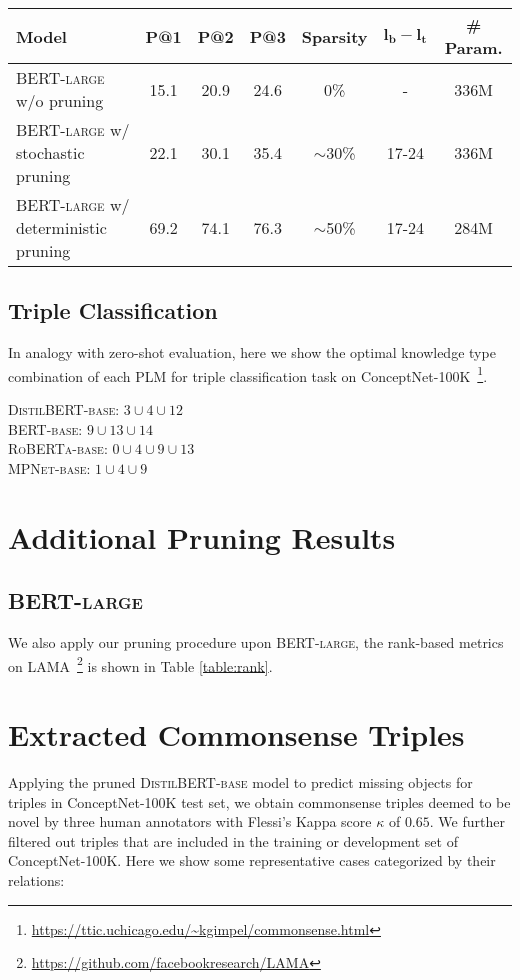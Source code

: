 \documentclass[11pt]{article}
\begin{document}
\begin{table*}[tb!]
	\centering
	\footnotesize
	\begin{tabular}{l|ccc|c|c|c}
		\toprule
		\textbf{Model} & \textbf{P@1} & \textbf{P@2} & \textbf{P@3} & \textbf{Sparsity}  & $\bm{l_b-l_t}$ & \textbf{\# Param.}\\
		\midrule
		\textsc{BERT-large} w/o pruning &15.1  &20.9   &24.6  & 0\% & - &336M  \\
		\textsc{BERT-large} w/ stochastic pruning &22.1  &30.1   &35.4   & $\sim$30\% & 17-24 &336M \\
		\textsc{BERT-large} w/ deterministic pruning &69.2  &74.1   &76.3   & $\sim$50\% & 17-24 & 284M\\
		\bottomrule
	\end{tabular}
	\caption{Macro-averaged precision metrics of \textsc{BERT-large} on the ConceptNet subset of LAMA.}
	\label{table:rank}
\end{table*}
\subsection{Triple Classification}
In analogy with zero-shot evaluation, here we show the optimal knowledge type combination of each PLM for triple classification task on ConceptNet-100K~\footnote{\url{https://ttic.uchicago.edu/~kgimpel/commonsense.html}}.

\noindent
\textsc{DistilBERT-base}: $3\cup 4\cup 12$\\
\textsc{BERT-base}: $9\cup 13\cup 14$\\
\textsc{RoBERTa-base}: $0\cup 4\cup 9\cup 13$\\
\textsc{MPNet-base}: $1\cup 4\cup 9$
\section{Additional Pruning Results}
\subsection{\textsc{BERT-large}}
We also apply our pruning procedure upon \textsc{BERT-large}, the rank-based metrics on LAMA~\footnote{\url{https://github.com/facebookresearch/LAMA}} is shown in Table \ref{table:rank}.

\section{Extracted Commonsense Triples}
Applying the pruned \textsc{DistilBERT-base} model to predict missing objects for triples in ConceptNet-100K test set, we obtain commonsense triples deemed to be novel by three human annotators with Flessi's Kappa score $\kappa$ of $0.65$. We further filtered out triples that are included in the training or development set of ConceptNet-100K. Here we show some representative cases categorized by their relations:
\end{document}
